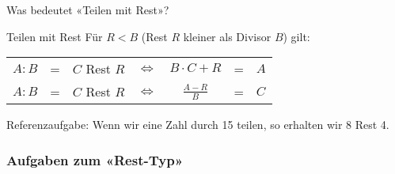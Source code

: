 
Was bedeutet «Teilen mit Rest»?


\begin{gesetz}{Teilen mit Rest}{}
  Für $R<B$ (Rest $R$ kleiner als Divisor $B$) gilt:

  \vspace{7mm}

  \begin{tabular}{rcccccl}
  $A:B$ & = & $C$ Rest $R$ & $\Longleftrightarrow$ & $B\cdot{}C+R$ & = & $A$ \\
  $A:B$ & = & $C$ Rest $R$ & $\Longleftrightarrow$ & $\frac{A-R}{B}$ & = & $C$ \\
\end{tabular}
\end{gesetz}

  Referenzaufgabe: Wenn wir eine Zahl durch 15 teilen, so erhalten wir
  8 Rest 4.



\subsubsection*{Aufgaben zum «Rest-Typ»}

\newpage

